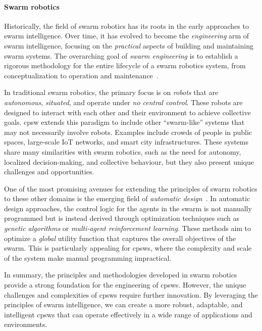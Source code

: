 \paragraph*{Swarm robotics}

Historically, 
 the field of swarm robotics has its roots in the early approaches to swarm intelligence. 
 Over time, it has evolved to become the \textit{engineering} arm of swarm intelligence, 
 focusing on the \emph{practical} aspects of building and maintaining swarm systems. 
 The overarching goal of \emph{swarm engineering} is to establish a rigorous methodology for the entire lifecycle of a swarm robotics system, 
 from conceptualization to operation and maintenance~\cite{DBLP:journals/swarm/BrambillaFBD13}.

In traditional swarm robotics, the primary focus is on \textit{robots} that are \emph{autonomous}, \emph{situated}, and operate under \emph{no central control}. 
 These robots are designed to interact with each other and their environment to achieve collective goals. 
 \ac{cpsw} extends this paradigm to include other ``swarm-like'' systems that may not necessarily involve robots. 
 Examples include crowds of people in public spaces, 
 large-scale IoT networks, and smart city infrastructures. 
 These systems share many similarities with swarm robotics, 
 such as the need for autonomy, 
 localized decision-making, 
 and collective behaviour, but they also present unique challenges and opportunities.

One of the most promising avenues for extending the principles of swarm robotics to these other domains is the emerging field of \textit{automatic design}~\cite{DBLP:journals/firai/FrancescaB16}. 
 In automatic design approaches, 
 the control logic for the agents in the swarm is not manually programmed but is instead derived through optimization techniques such as \textit{genetic algorithms} or \textit{multi-agent reinforcement learning}.
These methods aim to optimize a \textit{global} utility function that captures the overall objectives of the swarm. 
 This is particularly appealing for \acp{cpsw}, 
 where the complexity and scale of the system make manual programming impractical.

In summary, 
 the principles and methodologies developed in swarm robotics provide a strong foundation for the engineering of \acp{cpsw}. 
 However, the unique challenges and complexities of \acp{cpsw} require further innovation. 
 By leveraging the principles of swarm intelligence,
 we can create a more robust, adaptable, and intelligent \acp{cpsw} that can operate effectively in a wide range of applications and environments.

